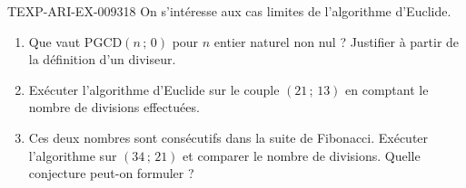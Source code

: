 % 
% 
\begin{exercice}{TEXP-ARI-EX-009}{3}{18}
On s'intéresse aux cas limites de l'algorithme d'Euclide.
\begin{enumerate}
  \item Que vaut $\mathrm{PGCD}(n\,;\,0)$ pour $n$ entier naturel non nul ?
        Justifier à partir de la définition d'un diviseur.
  \item Exécuter l'algorithme d'Euclide sur le couple $(21\,;\,13)$ en
        comptant le nombre de divisions effectuées.
  \item Ces deux nombres sont consécutifs dans la suite de Fibonacci. Exécuter
        l'algorithme sur $(34\,;\,21)$ et comparer le nombre de divisions.
        Quelle conjecture peut-on formuler ?
\end{enumerate}
\end{exercice}
